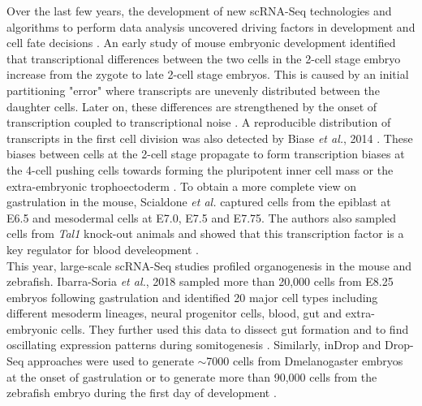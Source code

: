Over the last few years, the development of new scRNA-Seq technologies and algorithms to perform data analysis uncovered driving factors in development and cell fate decisions \citep{Griffiths2018}. 
An early study of mouse embryonic development identified that transcriptional differences between the two cells in the 2-cell stage embryo increase from the zygote to late 2-cell stage embryos. 
This is caused by an initial partitioning "error" where transcripts are unevenly distributed between the daughter cells. 
Later on, these differences are strengthened by the onset of transcription coupled to transcriptional noise \citep{Piras2014, Shi2015a}. 
A reproducible distribution of transcripts in the first cell division was also detected by Biase \emph{et al.}, 2014 \cite{Biase2014}. 
These biases between cells at the 2-cell stage propagate to form transcription biases at the 4-cell pushing cells towards forming the pluripotent inner cell mass or the extra-embryonic trophoectoderm \citep{Goolam2016, Shi2015a}. 
To obtain a more complete view on gastrulation in the mouse, Scialdone \emph{et al.} captured cells from the epiblast at E6.5 and mesodermal cells at E7.0, E7.5 and E7.75. 
The authors also sampled cells from \emph{Tal1} knock-out animals and showed that this transcription factor is a key regulator for blood develeopment \citep{Scialdone2016}. \\

This year, large-scale scRNA-Seq studies profiled organogenesis in the mouse and zebrafish. 
Ibarra-Soria \emph{et al.}, 2018 sampled more than 20,000 cells from E8.25 embryos following gastrulation and identified 20 major cell types including different mesoderm lineages, neural progenitor cells, blood, gut and extra-embryonic cells. 
They further used this data to dissect gut formation and to find oscillating expression patterns during somitogenesis \citep{Ibarra-Soria2018}. 
Similarly, inDrop and Drop-Seq approaches were used to generate $\sim$7000 cells from \gls{Dmelanogaster} embryos at the onset of gastrulation \citep{Karaiskos2017} or to generate more than 90,000 cells from the zebrafish embryo during the first day of development \citep{Wagner2018}.\\

